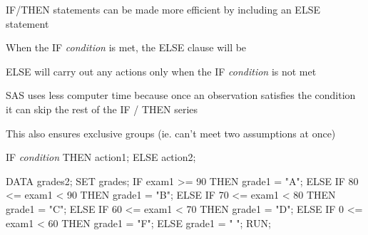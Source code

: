 


\begin{frame}[fragile]
\bi
\item IF/THEN statements can be made more efficient by including an ELSE statement
\item When the IF \emph{condition} is met, the ELSE clause will be 
\item ELSE will carry out any actions only when the IF \emph{condition} is not met
\item SAS uses less computer time because once an observation satisfies the condition it can skip the rest of the IF / THEN series
\item This also ensures exclusive groups (ie. can’t meet two assumptions at once)
\ei
{}
\footnotesize
\begin{code}{.0}
IF \emph{condition} THEN action1;
ELSE action2;
\end{code}
\emp
\end{frame}

\begin{frame}[fragile]
\footnotesize
\begin{code}{.0}
DATA grades2;
   SET grades;
   IF exam1 >=  90 THEN grade1 = "A";
   ELSE IF 80 <= exam1 < 90 THEN grade1 = "B";
   ELSE IF 70 <= exam1 < 80 THEN grade1 = "C";
   ELSE IF 60 <= exam1 < 70 THEN grade1 = "D";
   ELSE IF 0  <= exam1 < 60 THEN grade1 = "F";
   ELSE grade1 = " ";
RUN;
\end{code}
\emp
\end{frame}

